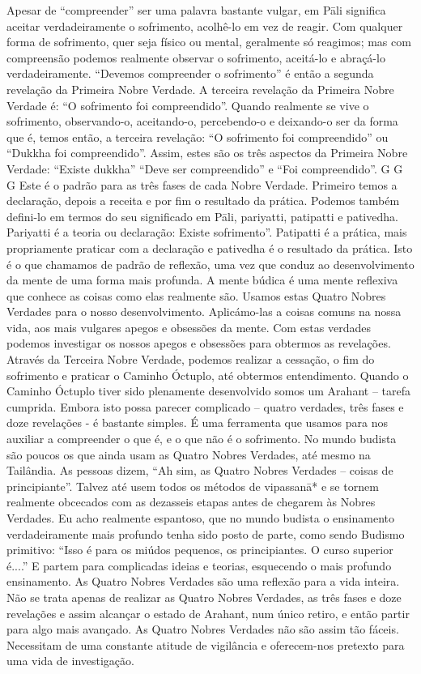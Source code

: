 Apesar de “compreender” ser uma palavra bastante vulgar,
em Pāli significa aceitar verdadeiramente o sofrimento, acolhê-lo em vez de reagir. Com qualquer forma de sofrimento,
quer seja físico ou mental, geralmente só reagimos; mas com
compreensão podemos realmente observar o sofrimento,
aceitá-lo e abraçá-lo verdadeiramente. “Devemos compreender
o sofrimento” é então a segunda revelação da Primeira Nobre
Verdade.
A terceira revelação da Primeira Nobre Verdade é: “O
sofrimento foi compreendido”. Quando realmente se vive o
sofrimento, observando-o, aceitando-o, percebendo-o e
deixando-o ser da forma que é, temos então, a terceira revelação: “O sofrimento foi compreendido” ou “Dukkha foi compreendido”. Assim, estes são os três aspectos da Primeira
Nobre Verdade: “Existe dukkha” “Deve ser compreendido” e
“Foi compreendido”.
G G G
Este é o padrão para as três fases de cada Nobre Verdade.
Primeiro temos a declaração, depois a receita e por fim o
resultado da prática. Podemos também defini-lo em termos do
seu significado em Pāli, pariyatti, patipatti e pativedha.
Pariyatti é a teoria ou declaração: Existe sofrimento”.
Patipatti é a prática, mais propriamente praticar com a declaração e pativedha é o resultado da prática. Isto é o que
chamamos de padrão de reflexão, uma vez que conduz ao
desenvolvimento da mente de uma forma mais profunda. A
mente búdica é uma mente reflexiva que conhece as coisas
como elas realmente são.
Usamos estas Quatro Nobres Verdades para o nosso
desenvolvimento. Aplicámo-las a coisas comuns na nossa
vida, aos mais vulgares apegos e obsessões da mente. Com
estas verdades podemos investigar os nossos apegos e
obsessões para obtermos as revelações. Através da Terceira
Nobre Verdade, podemos realizar a cessação, o fim do sofrimento e praticar o Caminho Óctuplo, até obtermos entendimento. Quando o Caminho Óctuplo tiver sido plenamente
desenvolvido somos um Arahant – tarefa cumprida. Embora
isto possa parecer complicado – quatro verdades, três fases e
doze revelações - é bastante simples. É uma ferramenta que
usamos para nos auxiliar a compreender o que é, e o que não
é o sofrimento.
No mundo budista são poucos os que ainda usam as
Quatro Nobres Verdades, até mesmo na Tailândia. As pessoas
dizem, “Ah sim, as Quatro Nobres Verdades – coisas de
principiante”. Talvez até usem todos os métodos de vipassanā*
e se tornem realmente obcecados com as dezasseis etapas
antes de chegarem às Nobres Verdades. Eu acho realmente
espantoso, que no mundo budista o ensinamento verdadeiramente mais profundo tenha sido posto de parte, como sendo
Budismo primitivo: “Isso é para os miúdos pequenos, os
principiantes. O curso superior é....” E partem para complicadas
ideias e teorias, esquecendo o mais profundo ensinamento.
As Quatro Nobres Verdades são uma reflexão para a vida
inteira. Não se trata apenas de realizar as Quatro Nobres
Verdades, as três fases e doze revelações e assim alcançar o
estado de Arahant, num único retiro, e então partir para algo
mais avançado. As Quatro Nobres Verdades não são assim
tão fáceis. Necessitam de uma constante atitude de vigilância
e oferecem-nos pretexto para uma vida de investigação.

